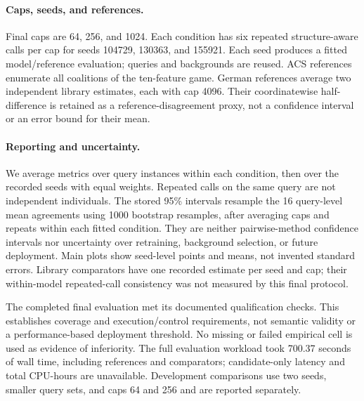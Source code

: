 \documentclass{article}
\begin{document}
\paragraph{Caps, seeds, and references.}
Final caps are 64, 256, and 1024. Each condition has six repeated structure-aware calls per cap for seeds 104729, 130363, and 155921. Each seed produces a fitted model/reference evaluation; queries and backgrounds are reused. ACS references enumerate all coalitions of the ten-feature game. German references average two independent library estimates, each with cap 4096. Their coordinatewise half-difference is retained as a reference-disagreement proxy, not a confidence interval or an error bound for their mean.

\paragraph{Reporting and uncertainty.}
We average metrics over query instances within each condition, then over the recorded seeds with equal weights. Repeated calls on the same query are not independent individuals. The stored 95\% intervals resample the 16 query-level mean agreements using 1000 bootstrap resamples, after averaging caps and repeats within each fitted condition. They are neither pairwise-method confidence intervals nor uncertainty over retraining, background selection, or future deployment. Main plots show seed-level points and means, not invented standard errors. Library comparators have one recorded estimate per seed and cap; their within-model repeated-call consistency was not measured by this final protocol.

The completed final evaluation met its documented qualification checks. This establishes coverage and execution/control requirements, not semantic validity or a performance-based deployment threshold. No missing or failed empirical cell is used as evidence of inferiority. The full evaluation workload took 700.37 seconds of wall time, including references and comparators; candidate-only latency and total CPU-hours are unavailable. Development comparisons use two seeds, smaller query sets, and caps 64 and 256 and are reported separately.
\end{document}
